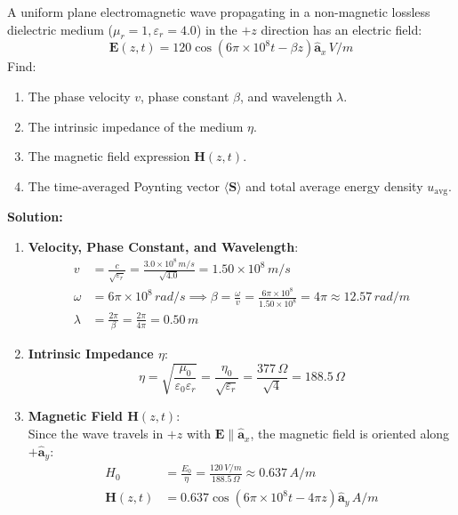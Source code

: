 \begin{example}
A uniform plane electromagnetic wave propagating in a non-magnetic lossless dielectric medium ($\mu_r = 1, \varepsilon_r = 4.0$) in the $+z$ direction has an electric field:
\begin{equation*}
    \mathbf{E}(z, t) = 120 \cos(6\pi \times 10^8 t - \beta z)\hat{\mathbf{a}}_x\,\si{V/m}
\end{equation*}
Find:
\begin{enumerate}
    \item The phase velocity $v$, phase constant $\beta$, and wavelength $\lambda$.
    \item The intrinsic impedance of the medium $\eta$.
    \item The magnetic field expression $\mathbf{H}(z, t)$.
    \item The time-averaged Poynting vector $\langle \mathbf{S} \rangle$ and total average energy density $u_{\text{avg}}$.
\end{enumerate}

\textbf{Solution:}
\begin{enumerate}
    \item \textbf{Velocity, Phase Constant, and Wavelength}:
    \begin{align*}
        v &= \frac{c}{\sqrt{\varepsilon_r}} = \frac{3.0 \times 10^8\,\si{m/s}}{\sqrt{4.0}} = 1.50 \times 10^8\,\si{m/s} \\
        \omega &= 6\pi \times 10^8\,\si{rad/s} \implies \beta = \frac{\omega}{v} = \frac{6\pi \times 10^8}{1.50 \times 10^8} = 4\pi \approx 12.57\,\si{rad/m} \\
        \lambda &= \frac{2\pi}{\beta} = \frac{2\pi}{4\pi} = 0.50\,\si{m}
    \end{align*}
    
    \item \textbf{Intrinsic Impedance $\eta$}:
    \begin{equation*}
        \eta = \sqrt{\frac{\mu_0}{\varepsilon_0 \varepsilon_r}} = \frac{\eta_0}{\sqrt{\varepsilon_r}} = \frac{377\,\Omega}{\sqrt{4}} = 188.5\,\Omega
    \end{equation*}
    
    \item \textbf{Magnetic Field $\mathbf{H}(z, t)$}:\\
    Since the wave travels in $+z$ with $\mathbf{E} \parallel \hat{\mathbf{a}}_x$, the magnetic field is oriented along $+\hat{\mathbf{a}}_y$:
    \begin{align*}
        H_0 &= \frac{E_0}{\eta} = \frac{120\,\si{V/m}}{188.5\,\Omega} \approx 0.637\,\si{A/m} \\
        \mathbf{H}(z, t) &= 0.637 \cos(6\pi \times 10^8 t - 4\pi z)\hat{\mathbf{a}}_y\,\si{A/m}
    \end{align*}
    

\end{enumerate}
\end{example}
